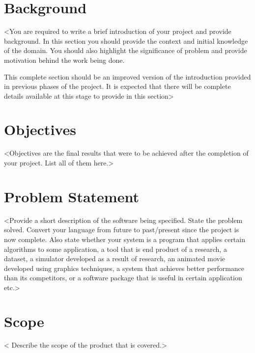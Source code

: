 \section{Background}
<You are required to write a brief introduction of your project and provide background. In this section you should provide the context and initial knowledge of the domain. You should also highlight the significance of problem and provide motivation behind the work being done.

This complete section should be an improved version of the introduction provided in previous phases of the project. It is expected that there will be complete details available at this stage to provide in this section>

\section{Objectives}
<Objectives are the final results that were to be achieved after the completion of your project. List all of them here.> 

\section{Problem Statement}
<Provide a short description of the software being specified. State the problem solved. Convert your language from future to past/present since the project is now complete. Also state whether your system is a program that applies certain algorithms to some application, a tool that is end product of a research, a dataset, a simulator developed as a result of research, an animated movie developed using graphics techniques, a system that achieves better performance than its competitors, or a software package that is useful in certain application etc.>

\section{Scope}
< Describe the scope of the product that is covered.>